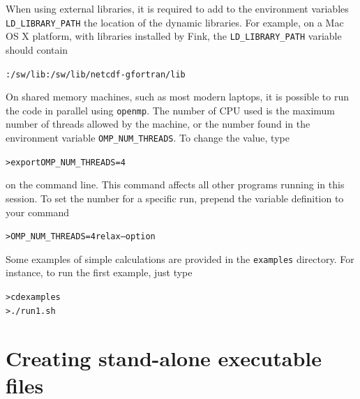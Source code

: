 \documentclass[10pt]{article}
\begin{document}
When using external libraries, it is required to add to the environment variables \verb'LD_LIBRARY_PATH' the location of the dynamic libraries. For example, on a Mac OS X platform, with libraries installed by Fink, the \verb'LD_LIBRARY_PATH' variable should contain
\begin{alltt}
{\color{NavyBlue}:/sw/lib:/sw/lib/netcdf-gfortran/lib}
\end{alltt}

On shared memory machines, such as most modern laptops, it is possible to run the code in parallel using \verb'openmp'. The number of CPU used is the maximum number of threads allowed by the machine, or the number found in the environment variable \verb'OMP_NUM_THREADS'. To change the value, type
\begin{alltt}
{\color{orange}> export OMP_NUM_THREADS=4}
\end{alltt}
on the command line. This command affects all other programs running in this session. To set the number for a specific run, prepend the variable definition to your command
\begin{alltt}
{\color{orange}> OMP_NUM_THREADS=4 relax --option}
\end{alltt}

Some examples of simple calculations are provided in the \verb'examples' directory. For instance, to run the first example, just type
\begin{alltt}
{\color{orange}> cd examples
> ./run1.sh}
\end{alltt}



\section{Creating stand-alone executable files}
\end{document}
